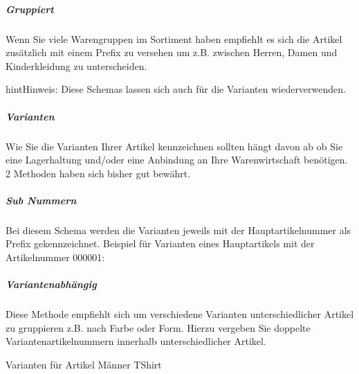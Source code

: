 \documentclass[letterpaper,10pt,ngerman]{sphinxmanual}
\begin{document}
\subparagraph{Gruppiert}
\label{\detokenize{modules/general/skuscheme:gruppiert}}
Wenn Sie viele Warengruppen im Sortiment haben empfiehlt es sich die Artikel zusätzlich mit einem Prefix zu versehen
um z.B. zwischen Herren, Damen und Kinderkleidung zu unterscheiden.

\begin{sphinxVerbatim}[commandchars=\\\{\}]
\end{sphinxVerbatim}

\begin{sphinxadmonition}{hint}{Hinweis:}
Diese Schemas lassen sich auch für die Varianten wiederverwenden.
\end{sphinxadmonition}


\subparagraph{Varianten}
\label{\detokenize{modules/general/skuscheme:varianten}}
Wie Sie die Varianten Ihrer Artikel kennzeichnen sollten hängt davon ab ob Sie eine Lagerhaltung
und/oder eine Anbindung an Ihre Warenwirtschaft benötigen. 2 Methoden haben sich bisher gut bewährt.


\subparagraph{Sub Nummern}
\label{\detokenize{modules/general/skuscheme:sub-nummern}}
Bei diesem Schema werden die Varianten jeweils mit der Hauptartikelnummer als Prefix gekennzeichnet.
Beispiel für Varianten eines Hauptartikels mit der Artikelnummer 000001:

\begin{sphinxVerbatim}[commandchars=\\\{\}]
\end{sphinxVerbatim}


\subparagraph{Variantenabhängig}
\label{\detokenize{modules/general/skuscheme:variantenabhangig}}
Diese Methode empfiehlt sich um verschiedene Varianten unterschiedlicher Artikel zu gruppieren \sphinxhyphen{}
z.B. nach Farbe oder Form. Hierzu vergeben Sie doppelte Variantenartikelnummern innerhalb unterschiedlicher Artikel.

Varianten für Artikel Männer T\sphinxhyphen{}Shirt

\begin{sphinxVerbatim}[commandchars=\\\{\}]
 
 
 
 
\end{sphinxVerbatim}
\end{document}

